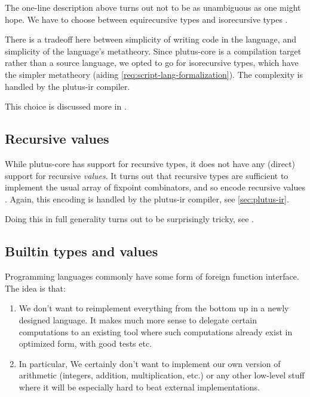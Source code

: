 The one-line description above turns out not to be as unambiguous as one might hope. We have
to choose between equirecursive types and isorecursive types \autocite[chapter 21]{pierce2002types}.

There is a tradeoff here between simplicity of writing code in the language, and simplicity of the language's metatheory.
Since \gls{plutus-core} is a compilation target rather than a source language, we opted to go for isorecursive types, which have the simpler metatheory (aiding \cref{req:script-lang-formalization}).
The complexity is handled by the \gls{plutus-ir} compiler.

This choice is discussed more in \textcite{plutus-core-spec, peytonjones2019unraveling}.

\subsection{Recursive values}

While \gls{plutus-core} has support for recursive types, it does not have any (direct) support for recursive \emph{values}.
It turns out that recursive types are sufficient to implement the usual array of fixpoint combinators, and so encode recursive values \autocite{harper2012practical}.
Again, this encoding is handled by the \gls{plutus-ir} compiler, see \cref{sec:plutus-ir}.

Doing this in full generality turns out to be surprisingly tricky, see \textcite{peytonjones2019unraveling}.

\subsection{Builtin types and values}

Programming languages commonly have some form of foreign function interface. The idea is that:

\begin{enumerate}
\item
  We don't want to reimplement everything from the bottom up in a newly designed language.
  It makes much more sense to delegate certain computations to an existing tool where such computations already exist in optimized form, with good tests etc.
\item
  In particular, We certainly don't want to implement our own version of arithmetic (integers, addition, multiplication, etc.) or any other low-level stuff where it will be especially hard to beat external implementations.
\end{enumerate}

